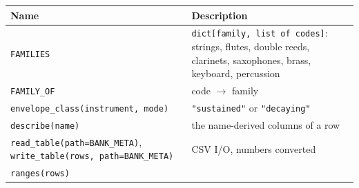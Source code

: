 \documentclass[
  10pt,
]{article}
\begin{document}
\begin{longtable}[]{@{}ll@{}}
\toprule
\begin{minipage}[b]{0.47\columnwidth}\raggedright
Name\strut
\end{minipage} &
\begin{minipage}[b]{0.47\columnwidth}\raggedright
Description\strut
\end{minipage}\tabularnewline
\midrule
\endhead
\begin{minipage}[t]{0.47\columnwidth}\raggedright
\texttt{FAMILIES}\strut
\end{minipage} &
\begin{minipage}[t]{0.47\columnwidth}\raggedright
\texttt{dict{[}family,\ list\ of\ codes{]}}: strings,
flutes, double reeds, clarinets, saxophones, brass,
keyboard, percussion\strut
\end{minipage}\tabularnewline
\begin{minipage}[t]{0.47\columnwidth}\raggedright
\texttt{FAMILY\_OF}\strut
\end{minipage} &
\begin{minipage}[t]{0.47\columnwidth}\raggedright
code $\rightarrow$ family\strut
\end{minipage}\tabularnewline
\begin{minipage}[t]{0.47\columnwidth}\raggedright
\texttt{envelope\_class(instrument,\ mode)}\strut
\end{minipage} &
\begin{minipage}[t]{0.47\columnwidth}\raggedright
\texttt{"sustained"} or \texttt{"decaying"}\strut
\end{minipage}\tabularnewline
\begin{minipage}[t]{0.47\columnwidth}\raggedright
\texttt{describe(name)}\strut
\end{minipage} &
\begin{minipage}[t]{0.47\columnwidth}\raggedright
the name-derived columns of a row\strut
\end{minipage}\tabularnewline
\begin{minipage}[t]{0.47\columnwidth}\raggedright
\texttt{read\_table(path=BANK\_META)},
\texttt{write\_table(rows,\ path=BANK\_META)}\strut
\end{minipage} &
\begin{minipage}[t]{0.47\columnwidth}\raggedright
CSV I/O, numbers converted\strut
\end{minipage}\tabularnewline
\begin{minipage}[t]{0.47\columnwidth}\raggedright
\texttt{ranges(rows)}\strut
\end{minipage} &

\end{longtable}
\end{document}
